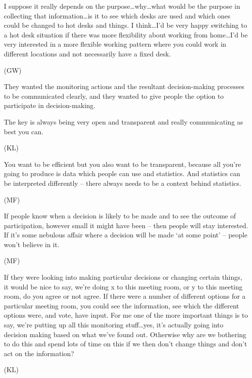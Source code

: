 \begin{qt}I suppose it really depends on the purpose\ldots why\ldots what would be the
purpose in collecting that information\ldots is it to see which desks are
used and which ones could be changed to hot desks and things. I
think\ldots I’d be very happy switching to a hot desk situation if there was
more flexibility about working from home\ldots I’d be very interested in a
more flexible working pattern where you could work in different
locations and not necessarily have a fixed desk.\end{qt} (GW)

They wanted the monitoring actions and the resultant decision-making
processes to be communicated clearly, and they wanted to give people
the option to participate in decision-making.

\begin{qt}The key is always being very open and transparent and really
communicating as best you can.\end{qt} (KL)

\begin{qt}You want to be efficient but you also want to be transparent, because
all you’re going to produce is data which people can use and
statistics. And statistics can be interpreted differently – there
always needs to be a context behind statistics.\end{qt} (MF) 

\begin{qt}If people know when a decision is likely to be made and to see the
outcome of participation, however small it might have been – then
people will stay interested. If it’s some nebulous affair where a
decision will be made ‘at some point’ – people won’t believe in it.\end{qt}
(MF)

\begin{qt}If they were looking into making particular decisions or changing
certain things, it would be nice to say, we’re doing x to this meeting
room, or y to this meeting room, do you agree or not agree. If there
were a number of different options for a particular meeting room, you
could see the information, see which the different options were, and
vote, have input. For me one of the more important things is to say,
we’re putting up all this monitoring stuff\ldots yes, it’s actually going
into decision making based on what we’ve found out. Otherwise why are
we bothering to do this and spend lots of time on this if we then
don’t change things and don’t act on the information?\end{qt} (KL)

